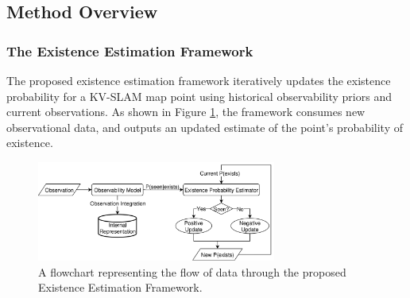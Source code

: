 \subsection{Method Overview}



\subsubsection{The Existence Estimation Framework}

The proposed existence estimation framework iteratively updates the existence probability for a KV-SLAM map point using historical observability priors and current observations. As shown in Figure \ref{fig:existence_estimation_framework}, the framework consumes new observational data, and outputs an updated estimate of the point's probability of existence.

\begin{figure}[!ht]
    \centering
    \includegraphics[width=0.7\textwidth]{resources/existence_estimation_framework.png}
    \caption[Existence Estimation Framework]{A flowchart representing the flow of data through the proposed Existence Estimation Framework.}
    \label{fig:existence_estimation_framework}
\end{figure}

